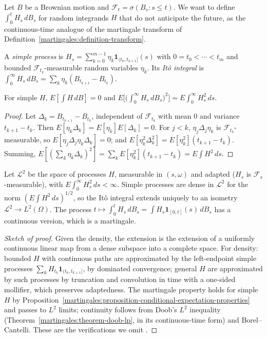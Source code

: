 Let $B$ be a Brownian motion and $\mathcal{F}_t = \sigma(B_s : s \leq t)$. We want to define $\int_0^tH_s\,dB_s$ for random integrands $H$ that do not anticipate the future, as the continuous-time analogue of the martingale
transform of Definition~\ref{martingales:definition-transform}.

\begin{definition}\label{martingales:definition-simple-process}
A \emph{simple process} is $H_s = \sum_{k=0}^{m-1}\eta_k\mathbf{1}_{(t_k, t_{k+1}]}(s)$ with $0 = t_0 < \cdots < t_m$ and bounded $\mathcal{F}_{t_k}$-measurable random variables $\eta_k$. Its \emph{It\^o integral} is
$\int_0^\infty H_s\,dB_s = \sum_k\eta_k(B_{t_{k+1}} - B_{t_k})$.
\end{definition}

\begin{proposition}[It\^o isometry]\label{martingales:proposition-ito-isometry}
For simple $H$, $E[\int H\,dB] = 0$ and $E\bigl[\bigl(\int_0^\infty H_s\,dB_s\bigr)^2\bigr] = E\int_0^\infty H_s^2\,ds$.
\end{proposition}

\begin{proof}
Let $\Delta_k = B_{t_{k+1}} - B_{t_k}$, independent of $\mathcal{F}_{t_k}$ with mean $0$ and variance $t_{k+1} - t_k$. Then $E[\eta_k\Delta_k] = E[\eta_k]E[\Delta_k] = 0$. For $j < k$, $\eta_j\Delta_j\eta_k$ is $\mathcal{F}_{t_k}$-measurable, so
$E[\eta_j\Delta_j\eta_k\Delta_k] = 0$; and $E[\eta_k^2\Delta_k^2] = E[\eta_k^2](t_{k+1} - t_k)$. Summing, $E[(\sum_k\eta_k\Delta_k)^2] = \sum_kE[\eta_k^2](t_{k+1} - t_k) = E\int H^2\,ds$.
\end{proof}

\begin{theorem}\label{martingales:theorem-ito-integral}
Let $\mathcal{L}^2$ be the space of processes $H$, measurable in $(s, \omega)$ and adapted ($H_s$ is $\mathcal{F}_s$-measurable), with $E\int_0^\infty H_s^2\,ds < \infty$. Simple processes are dense in $\mathcal{L}^2$ for the norm
$(E\int H^2\,ds)^{1/2}$, so the It\^o integral extends uniquely to an isometry $\mathcal{L}^2 \to L^2(\Omega)$. The process $t \mapsto \int_0^tH_s\,dB_s = \int H_s\mathbf{1}_{[0, t]}(s)\,dB_s$ has a continuous version, which is a martingale.
\end{theorem}

\begin{proof}[Sketch of proof]
Given the density, the extension is the extension of a uniformly continuous linear map from a dense subspace into a complete space. For density: bounded $H$ with continuous paths are approximated by the left-endpoint simple
processes $\sum_kH_{t_k}\mathbf{1}_{(t_k, t_{k+1}]}$, by dominated convergence; general $H$ are approximated by such processes by truncation and convolution in time with a one-sided mollifier, which preserves adaptedness.
The martingale property holds for simple $H$ by Proposition~\ref{martingales:proposition-conditional-expectation-properties} and passes to $L^2$ limits; continuity follows from Doob's $L^2$ inequality
(Theorem~\ref{martingales:theorem-doob-lp}, in its continuous-time form) and Borel--Cantelli. These are the verifications we omit \cite{karatzas-shreve}.
\end{proof}

